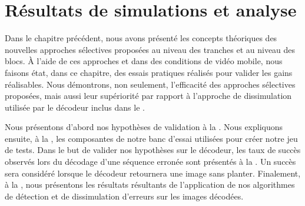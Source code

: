 \chapter{Résultats de simulations et analyse}
\label{chap-resultats}
Dans le chapitre précédent, nous avons présenté les concepts théoriques des
nouvelles approches sélectives proposées  au niveau des tranches et au niveau
des blocs. À l'aide de ces approches et dans des conditions de vidéo mobile,
nous faisons état, dans ce chapitre, des essais pratiques réalisés pour valider
les gains réalisables. Nous démontrons, non seulement, l'efficacité des
approches sélectives proposées, mais aussi leur supériorité par rapport à
l'approche de dissimulation utilisée par le décodeur inclus dans le \ltCodec.

Nous présentons d'abord nos hypothèses de validation à la
. Nous expliquons ensuite, à la
, les composantes de notre banc d'essai utilisées pour créer
notre jeu de tests. Dans le but de valider nos hypothèses sur le décodeur, les
taux de succès observés lors du décodage d'une séquence erronée sont présentés à
la . Un succès sera considéré lorsque le décodeur
retournera une image sans planter. Finalement, à la
, nous présentons les résultats résultants de
l'application de nos algorithmes de détection et de dissimulation d'erreurs sur
les images décodées.

